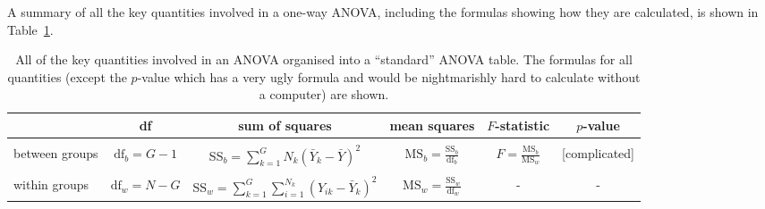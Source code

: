 A summary of all the key quantities involved in a one-way ANOVA, including the formulas showing how they are calculated, is shown in Table~\ref{tab:anovatable}. 

\begin{table}
\begin{center}
\caption{All of the key quantities involved in an ANOVA organised into a ``standard'' ANOVA table. The formulas for all quantities (except the $p$-value which has a very ugly formula and would be nightmarishly hard to calculate without a computer) are shown.} 

\tabcapsep
\label{tab:anovatable}
\small
\begin{tabular}{p{1.8cm}|c|c|c|c|c} 
& df & sum of squares & mean squares & $F$-statistic & $p$-value \\  \hline  &&&&& \\ 
\raggedright
between groups & $\mbox{df}_b = G-1$ & SS$_b = \displaystyle\sum_{k=1}^G N_k (\bar{Y}_k - \bar{Y})^2$ & $\mbox{MS}_b = \displaystyle\frac{\mbox{SS}_b}{\mbox{df}_b}$ & $ F = \displaystyle\frac{\mbox{MS}_b }{ \mbox{MS}_w }$ & [complicated] \\ &&&&&\\ 
\raggedright
within groups   & $\mbox{df}_w = N-G$ & SS$_w = \displaystyle\sum_{k=1}^G \displaystyle\sum_{i = 1}^{N_k} ( {Y}_{ik} - \bar{Y}_k)^2$ & $\mbox{MS}_w =  \displaystyle\frac{\mbox{SS}_w}{\mbox{df}_w}$ & - & - \\ 
\end{tabular}
\tabcapsep
\HR
\end{center}
\end{table}

